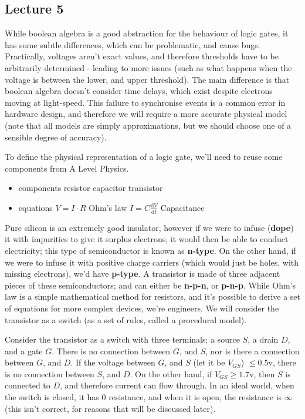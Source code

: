 \documentclass[a4paper, 12pt]{article}
\newcommand{\dif}[2]{\frac{\mathrm{d}#1}{\mathrm{d}#2}}
\begin{document}
        \subsection*{Lecture 5}
            While boolean algebra is a good abstraction for the behaviour of logic gates, it has some subtle differences, which can be problematic, and cause bugs. Practically, voltages aren't exact values, and therefore thresholds have to be arbitrarily determined - leading to more issues (such as what happens when the voltage is between the lower, and upper threshold). The main difference is that boolean algebra doesn't consider time delays, which exist despite electrons moving at light-speed. This failure to synchronise events is a common error in hardware design, and therefore we will require a more accurate physical model (note that all models are simply approximations, but we should choose one of a sensible degree of accuracy).
            \medskip

            To define the physical representation of a logic gate, we'll need to reuse some components from A Level Physics.
            \begin{itemize}
                \itemsep0em
                \item components
                    \subitem resistor
                    \subitem capacitor
                    \subitem transistor
                \item equations
                    \subitem $V = I \cdot R$ \hfill Ohm's law
                    \subitem $I = C\dif{V}{t}$ \hfill Capacitance
            \end{itemize}
            Pure silicon is an extremely good insulator, however if we were to infuse (\textbf{dope}) it with impurities to give it surplus electrons, it would then be able to conduct electricity; this type of semiconductor is known as \textbf{n-type}. On the other hand, if we were to infuse it with positive charge carriers (which would just be holes, with missing electrons), we'd have \textbf{p-type}. A transistor is made of three adjacent pieces of these semiconductors; and can either be \textbf{n-p-n}, or \textbf{p-n-p}. While Ohm's law is a simple mathematical method for resistors, and it's possible to derive a set of equations for more complex devices, we're engineers. We will consider the transistor as a switch (as a set of rules, called a procedural model).
            \medskip

            Consider the transistor as a switch with three terminals; a source $S$, a drain $D$, and a gate $G$. There is no connection between $G$, and $S$, nor is there a connection between $G$, and $D$. If the voltage between $G$, and $S$ (let it be $V_{GS}$) $\leq 0.5\mathrm{v}$, there is no connection between $S$, and $D$. On the other hand, if $V_{GS} \geq 1.7\mathrm{v}$, then $S$ is connected to $D$, and therefore current can flow through. In an ideal world, when the switch is closed, it has 0 resistance, and when it is open, the resistance is $\infty$ (this isn't correct, for reasons that will be discussed later).
            \medskip
\end{document}
